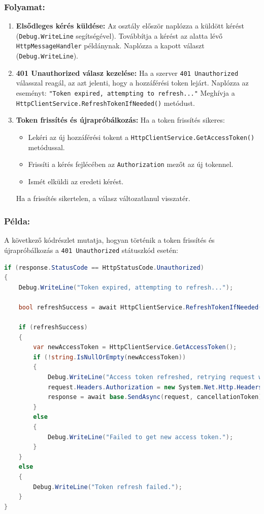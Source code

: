\documentclass{report}[11pt]
\begin{document}
\subsubsection{Folyamat:}
\begin{enumerate}
    \item \textbf{Elsődleges kérés küldése:}  
    Az osztály először naplózza a küldött kérést (\texttt{Debug.WriteLine} segítségével).  
    Továbbítja a kérést az alatta lévő \texttt{HttpMessageHandler} példánynak.  
    Naplózza a kapott választ (\texttt{Debug.WriteLine}).
    
    \item \textbf{401 Unauthorized válasz kezelése:}  
    Ha a szerver \texttt{401 Unauthorized} válasszal reagál, az azt jelenti, hogy a hozzáférési token lejárt.  
    Naplózza az eseményt: \texttt{"Token expired, attempting to refresh..."}  
    Meghívja a \texttt{HttpClientService.RefreshTokenIfNeeded()} metódust.
    
    \item \textbf{Token frissítés és újrapróbálkozás:}  
    Ha a token frissítés sikeres:  
    \begin{itemize}
        \item Lekéri az új hozzáférési tokent a \texttt{HttpClientService.GetAccessToken()} metódussal.
        \item Frissíti a kérés fejlécében az \texttt{Authorization} mezőt az új tokennel.
        \item Ismét elküldi az eredeti kérést.
    \end{itemize}
    Ha a frissítés sikertelen, a válasz változatlanul visszatér.
\end{enumerate}

\subsubsection{Példa:}
A következő kódrészlet mutatja, hogyan történik a token frissítés és újrapróbálkozás a \texttt{401 Unauthorized} státuszkód esetén:

\begin{lstlisting}[language=csharp]
if (response.StatusCode == HttpStatusCode.Unauthorized)
{
    Debug.WriteLine("Token expired, attempting to refresh...");

    bool refreshSuccess = await HttpClientService.RefreshTokenIfNeeded();

    if (refreshSuccess)
    {
        var newAccessToken = HttpClientService.GetAccessToken();
        if (!string.IsNullOrEmpty(newAccessToken))
        {
            Debug.WriteLine("Access token refreshed, retrying request with new token.");
            request.Headers.Authorization = new System.Net.Http.Headers.AuthenticationHeaderValue("Bearer", newAccessToken);
            response = await base.SendAsync(request, cancellationToken);
        }
        else
        {
            Debug.WriteLine("Failed to get new access token.");
        }
    }
    else
    {
        Debug.WriteLine("Token refresh failed.");
    }
}
\end{lstlisting}
\end{document}
